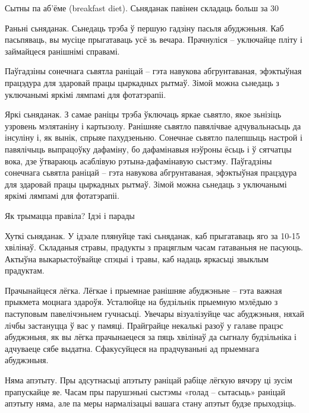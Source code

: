 Сытны па аб'ёме (breakfast diet).
Сьняданак павінен складаць больш за 30%

Раньні сьняданак. 
Сьнедаць трэба ў першую гадзіну пасьля абуджэньня. Каб пасьпяваць, вы мусіце прыгатаваць усё зь вечара. Прачнуліся – уключайце пліту і займайцеся ранішнімі справамі.

Паўгадзіны сонечнага сьвятла раніцай – гэта навукова абгрунтаваная, эфэктыўная працэдура для здаровай працы цыркадных рытмаў. Зімой можна сьнедаць з уключанымі яркімі лямпамі для фотатэрапіі.

Яркі сьняданак. 
З самае раніцы трэба ўключаць яркае сьвятло, якое зьнізіць узровень мэлятаніну і картызолу. Ранішняе сьвятло павялічвае адчувальнасьць да інсуліну і, як вынік, спрыяе пахудзеньню. Сонечнае сьвятло палепшыць настрой і павялічыць выпрацоўку дафаміну, бо дафамінавыя нэўроны ёсьць і ў сятчатцы вока, дзе ўтвараюць асаблівую рэтына-дафамінавую сыстэму. Паўгадзіны сонечнага сьвятла раніцай – гэта навукова абгрунтаваная, эфэктыўная працэдура для здаровай працы цыркадных рытмаў. Зімой можна сьнедаць з уключанымі яркімі лямпамі для фотатэрапіі.

Як трымацца правіла? Ідэі і парады

Хуткі сьняданак.
У ідэале плянуйце такі сьняданак, каб прыгатаваць яго за 10-15 хвілінаў. Складаныя стравы, прадукты з працяглым часам гатаваньня не пасуюць. Актыўна выкарыстоўвайце спэцыі і травы, каб надаць яркасьці звыклым прадуктам.

Прачынайцеся лёгка.
Лёгкае і прыемнае ранішняе абуджэньне – гэта важная прыкмета моцнага здароўя. Усталюйце на будзільнік прыемную мэлёдыю з паступовым павелічэньнем гучнасьці. Увечары візуалізуйце час абуджэньня, няхай лічбы застануцца ў вас у памяці. Прайграйце некалькі разоў у галаве працэс абуджэньня, як вы лёгка прачынаецеся за пяць хвілінаў да сыгналу будзільніка і адчуваеце сябе выдатна. Сфакусуйцеся на прадчуваньні ад прыемнага абуджэньня.

Няма апэтыту.
Пры адсутнасьці апэтыту раніцай рабіце лёгкую вячэру ці зусім прапускайце яе. Часам пры парушэньні сыстэмы «голад – сытасьць» раніцай апэтыту няма, але па меры нармалізацыі вашага стану апэтыт будзе прыходзіць.

